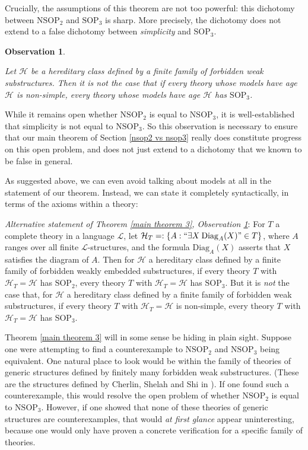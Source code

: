 \documentclass{amsart}
\newtheorem{observation}[theorem]{Observation}
\theoremstyle{definition}
\theoremstyle{remark}
\numberwithin{equation}{section}
\begin{document}
Crucially, the assumptions of this theorem are not too powerful: this dichotomy between $\mathrm{NSOP}_{2}$ and $\mathrm{SOP}_{3}$ is sharp. More precisely, the dichotomy does not extend to a false dichotomy between \textit{simplicity} and $\mathrm{SOP}_{3}$.


\begin{observation}\label{main observation}

Let $\mathcal{H}$ be a hereditary class defined by a finite family of forbidden weak substructures. Then it is \emph{not} the case that if every theory whose models have age $\mathcal{H}$ is non-simple, every theory whose models have age $\mathcal{H}$ has $\mathrm{SOP}_{3}$.


\end{observation}


While it remains open whether $\mathrm{NSOP}_{2}$ is equal to $\mathrm{NSOP}_{3}$, it is well-established that simplicity is not equal to $\mathrm{NSOP}_{3}$. So this observation is necessary to ensure that our main theorem of Section \ref{nsop2 vs nsop3} really does constitute progress on this open problem, and does not just extend to a dichotomy that we known to be false in general.

As suggested above, we can even avoid talking about models at all in the statement  of our theorem. Instead, we can state it completely syntactically, in terms of the axioms within a theory:

\:

\textit{Alternative statement of Theorem \ref{main theorem 3}, Observation \ref{main observation}}: For $T$ a complete theory in a language $\mathcal{L}$, let $\mathcal{H}_{T} =: \{A: ``\exists X \: \mathrm{Diag}_{A}(X)" \in T\}$, where $A$ ranges over all finite $\mathcal{L}$-structures, and the formula $\mathrm{Diag}_{A}(X)$ asserts that $X$ satisfies the diagram of $A$. Then for $\mathcal{H}$  a hereditary class defined by a finite family of forbidden weakly embedded substructures, if every theory $T$ with $\mathcal{H}_{T}=\mathcal{H}$ has $\mathrm{SOP}_{2}$, every theory $T$ with $\mathcal{H}_{T}=\mathcal{H}$ has $\mathrm{SOP}_{3}$. But it is \textit{not} the case that, for $\mathcal{H}$  a hereditary class defined by a finite family of forbidden weak substructures, if every theory $T$ with $\mathcal{H}_{T}=\mathcal{H}$ is non-simple, every theory $T$ with $\mathcal{H}_{T}=\mathcal{H}$ has $\mathrm{SOP}_{3}$.

\:


Theorem \ref{main theorem 3} will in some sense be hiding in plain sight. Suppose one were attempting to find a counterexample to $\mathrm{NSOP}_{2}$ and $\mathrm{NSOP}_{3}$ being equivalent. One natural place to look would be within the family of theories of generic structures defined by finitely many forbidden weak substructures. (These are the structures defined by Cherlin, Shelah and Shi in \cite{CSS99}). If one found such a counterexample, this would resolve the open problem of whether $\mathrm{NSOP}_{2}$ is equal to $\mathrm{NSOP}_{3}$. However, if one showed that none of these theories of generic structures are counterexamples, that would \textit{at first glance} appear uninteresting, because one would only have proven a concrete verification for a specific family of theories.
\end{document}
